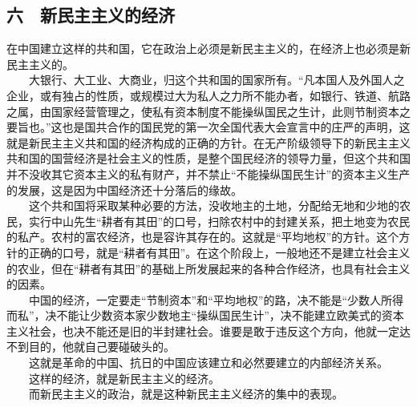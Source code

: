 \documentclass[cn,11pt,chinese]{elegantbook}
\def\myformat#1{\hfil\hfil #1}
\begin{document}
\subsection*{\myformat{六　新民主主义的经济}}
在中国建立这样的共和国，它在政治上必须是新民主主义的，在经济上也必须是新民主主义的。\\
　　大银行、大工业、大商业，归这个共和国的国家所有。“凡本国人及外国人之企业，或有独占的性质，或规模过大为私人之力所不能办者，如银行、铁道、航路之属，由国家经营管理之，使私有资本制度不能操纵国民之生计，此则节制资本之要旨也。”这也是国共合作的国民党的第一次全国代表大会宣言中的庄严的声明，这就是新民主主义共和国的经济构成的正确的方针。在无产阶级领导下的新民主主义共和国的国营经济是社会主义的性质，是整个国民经济的领导力量，但这个共和国并不没收其它资本主义的私有财产，并不禁止“不能操纵国民生计”的资本主义生产的发展，这是因为中国经济还十分落后的缘故。\\
　　这个共和国将采取某种必要的方法，没收地主的土地，分配给无地和少地的农民，实行中山先生“耕者有其田”的口号，扫除农村中的封建关系，把土地变为农民的私产。农村的富农经济，也是容许其存在的。这就是“平均地权”的方针。这个方针的正确的口号，就是“耕者有其田”。在这个阶段上，一般地还不是建立社会主义的农业，但在“耕者有其田”的基础上所发展起来的各种合作经济，也具有社会主义的因素。\\
　　中国的经济，一定要走“节制资本”和“平均地权”的路，决不能是“少数人所得而私”，决不能让少数资本家少数地主“操纵国民生计”，决不能建立欧美式的资本主义社会，也决不能还是旧的半封建社会。谁要是敢于违反这个方向，他就一定达不到目的，他就自己要碰破头的。\\
　　这就是革命的中国、抗日的中国应该建立和必然要建立的内部经济关系。\\
　　这样的经济，就是新民主主义的经济。\\
　　而新民主主义的政治，就是这种新民主主义经济的集中的表现。\\
\end{document}

